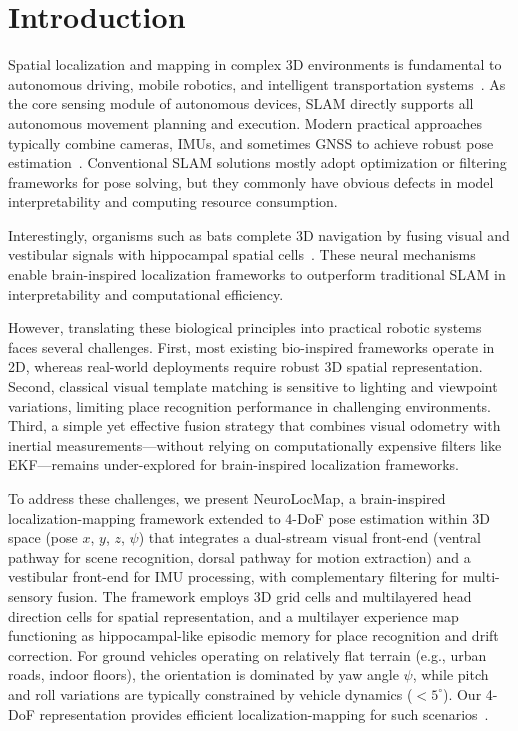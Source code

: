 \documentclass[5p,times]{elsarticle}
\begin{document}
\section{Introduction}
\label{sec:intro}

Spatial localization and mapping in complex 3D environments is fundamental to autonomous driving, mobile robotics, and intelligent transportation systems~\cite{cadena2016past}. As the core sensing module of autonomous devices, SLAM directly supports all autonomous movement planning and execution. Modern practical approaches typically combine cameras, IMUs, and sometimes GNSS to achieve robust pose estimation~\cite{saputra2018visual}. Conventional SLAM solutions mostly adopt optimization or filtering frameworks for pose solving, but they commonly have obvious defects in model interpretability and computing resource consumption.

Interestingly, organisms such as bats complete 3D navigation by fusing visual and vestibular signals with hippocampal spatial cells~\cite{jeffery2013navigating,hafting2005microstructure,taube1990head,finkelstein2016three,solstad2008representation}. These neural mechanisms enable brain-inspired localization frameworks to outperform traditional SLAM in interpretability and computational efficiency.

However, translating these biological principles into practical robotic systems faces several challenges. First, most existing bio-inspired frameworks operate in 2D, whereas real-world deployments require robust 3D spatial representation. Second, classical visual template matching is sensitive to lighting and viewpoint variations, limiting place recognition performance in challenging environments. Third, a simple yet effective fusion strategy that combines visual odometry with inertial measurements---without relying on computationally expensive filters like EKF---remains under-explored for brain-inspired localization frameworks.

To address these challenges, we present NeuroLocMap, a brain-inspired localization-mapping framework extended to 4-DoF pose estimation within 3D space (pose $x$, $y$, $z$, $\psi$) that integrates a dual-stream visual front-end (ventral pathway for scene recognition, dorsal pathway for motion extraction) and a vestibular front-end for IMU processing, with complementary filtering for multi-sensory fusion. The framework employs 3D grid cells and multilayered head direction cells for spatial representation, and a multilayer experience map functioning as hippocampal-like episodic memory for place recognition and drift correction. For ground vehicles operating on relatively flat terrain (e.g., urban roads, indoor floors), the orientation is dominated by yaw angle $\psi$, while pitch and roll variations are typically constrained by vehicle dynamics ($<5^\circ$). Our 4-DoF representation provides efficient localization-mapping for such scenarios~\cite{milford2004ratslam,milford2010persistent}.
\end{document}
